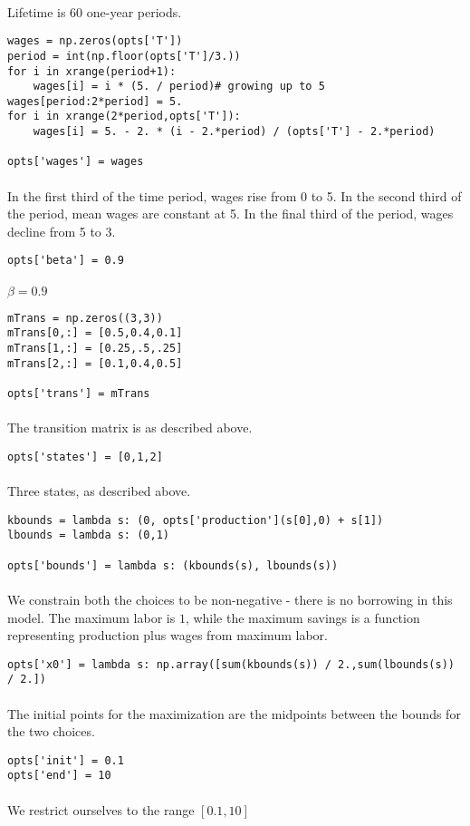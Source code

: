 \documentclass[11pt]{article}
\begin{document}
\paragraph{} Lifetime is 60 one-year periods.
\begin{verbatim}
wages = np.zeros(opts['T'])
period = int(np.floor(opts['T']/3.))
for i in xrange(period+1):
    wages[i] = i * (5. / period)# growing up to 5
wages[period:2*period] = 5.
for i in xrange(2*period,opts['T']):
    wages[i] = 5. - 2. * (i - 2.*period) / (opts['T'] - 2.*period)
	
opts['wages'] = wages	
\end{verbatim}
\paragraph{} In the first third of the time period, wages rise from 0 to 5. In the second third of the period, mean wages are constant at 5. In the final third of the period, wages decline from 5 to 3.
\begin{verbatim}
opts['beta'] = 0.9
\end{verbatim}
\paragraph{} $\beta=0.9$
\begin{verbatim}
mTrans = np.zeros((3,3))
mTrans[0,:] = [0.5,0.4,0.1]
mTrans[1,:] = [0.25,.5,.25]
mTrans[2,:] = [0.1,0.4,0.5]

opts['trans'] = mTrans
\end{verbatim}
\paragraph{} The transition matrix is as described above.
\begin{verbatim}	
opts['states'] = [0,1,2]
\end{verbatim}
\paragraph{} Three states, as described above.
\begin{verbatim}
kbounds = lambda s: (0, opts['production'](s[0],0) + s[1])
lbounds = lambda s: (0,1)

opts['bounds'] = lambda s: (kbounds(s), lbounds(s))
\end{verbatim}
\paragraph{} We constrain both the choices to be non-negative - there is no borrowing in this model. The maximum labor is $1$, while the maximum savings is a function representing production plus wages from maximum labor.
\begin{verbatim}
opts['x0'] = lambda s: np.array([sum(kbounds(s)) / 2.,sum(lbounds(s)) / 2.])
\end{verbatim}
\paragraph{} The initial points for the maximization are the midpoints between the bounds for the two choices.
\begin{verbatim}
opts['init'] = 0.1
opts['end'] = 10
\end{verbatim}
\paragraph{} We restrict ourselves to the range $[0.1,10]$
\end{document}
